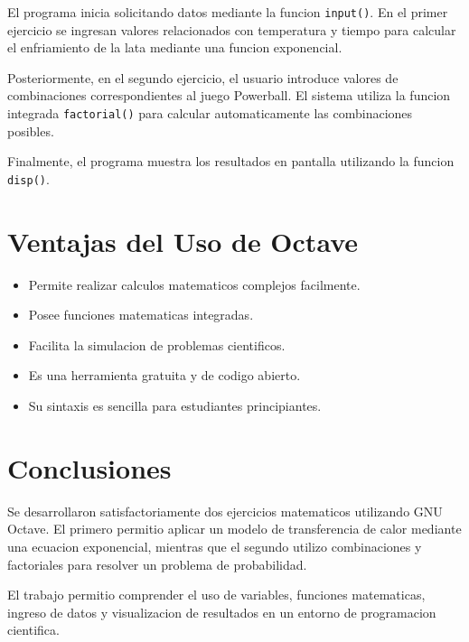 \documentclass[12pt]{article}
\begin{document}
El programa inicia solicitando datos mediante la funcion \texttt{input()}. En el primer ejercicio se ingresan valores relacionados con temperatura y tiempo para calcular el enfriamiento de la lata mediante una funcion exponencial.

Posteriormente, en el segundo ejercicio, el usuario introduce valores de combinaciones correspondientes al juego Powerball. El sistema utiliza la funcion integrada \texttt{factorial()} para calcular automaticamente las combinaciones posibles.

Finalmente, el programa muestra los resultados en pantalla utilizando la funcion \texttt{disp()}.


\section{Ventajas del Uso de Octave}

\begin{itemize}
\item Permite realizar calculos matematicos complejos facilmente.
\item Posee funciones matematicas integradas.
\item Facilita la simulacion de problemas cientificos.
\item Es una herramienta gratuita y de codigo abierto.
\item Su sintaxis es sencilla para estudiantes principiantes.
\end{itemize}


\section{Conclusiones}

Se desarrollaron satisfactoriamente dos ejercicios matematicos utilizando GNU Octave. El primero permitio aplicar un modelo de transferencia de calor mediante una ecuacion exponencial, mientras que el segundo utilizo combinaciones y factoriales para resolver un problema de probabilidad.

El trabajo permitio comprender el uso de variables, funciones matematicas, ingreso de datos y visualizacion de resultados en un entorno de programacion cientifica.
\end{document}
